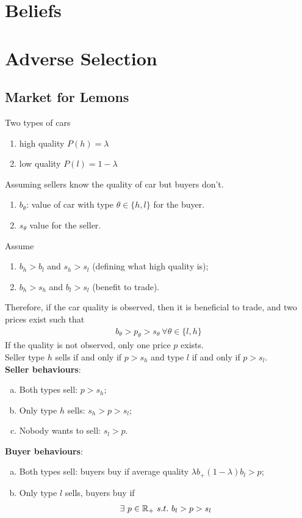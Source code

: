 \documentclass{article}
\begin{document}
   	\section{Beliefs}
   	
   	\section{Adverse Selection}
   	\subsection{Market for Lemons}
   	\par Two types of cars
   	\begin{enumerate}
   		\item high quality $P(h) = \lambda$
   		\item low quality $P(l) = 1 - \lambda$
   	\end{enumerate}
   	Assuming sellers know the quality of car but buyers don't.
   	\begin{enumerate}
   		\item $b_\theta$: value of car with type $\theta \in \{h, l\}$ for the buyer.
   		\item $s_\theta$ value for the seller.
   	\end{enumerate}
   	Assume
   	\begin{enumerate}
   		\item $b_h > b_l$ and $s_h > s_l$ (defining what high quality is);
   		\item $b_h > s_h$ and $b_l > s_l$ (benefit to trade).
   	\end{enumerate}
   	Therefore, if the car quality is observed, then it is beneficial to trade, and two prices exist such that
   	\begin{align}
   		b_\theta > p_\theta > s_\theta\ \forall \theta \in \{l, h\}
   	\end{align}
   	If the quality is not observed, only one price $p$ exists. \\
   	Seller type $h$ sells if and only if $p > s_h$ and type $l$ if and only if $p > s_l$. \\
   	\textbf{Seller behaviours}:
   	\begin{enumerate}[(a)]
   		\item Both types sell: $p > s_h$;
   		\item Only type $h$ sells: $s_h > p > s_l$;
   		\item Nobody wants to sell: $s_l > p$.
   	\end{enumerate}
   	\textbf{Buyer behaviours}:
   	\begin{enumerate}[(a)]
   		\item Both types sell: buyers buy if average quality $\lambda b_ + (1 - \lambda)b_l > p$;
   		\item Only type $l$ sells, buyers buy if
   		\begin{align}
   			\exists\ p\in \mathbb{R}_+\ s.t.\ b_l > p > s_l
   		\end{align}
   	\end{enumerate}
   	
\end{document}
